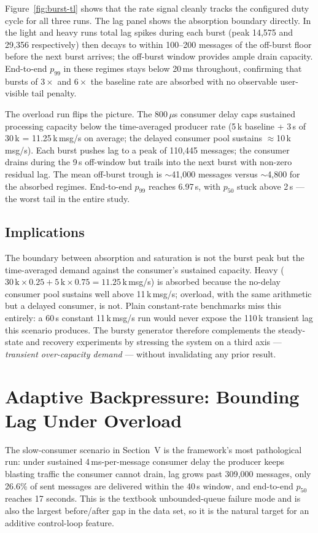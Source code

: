 \documentclass[conference]{IEEEtran}
\begin{document}
Figure~\ref{fig:burst-tl} shows that the rate signal cleanly tracks
the configured duty cycle for all three runs. The lag panel shows
the absorption boundary directly. In the light and heavy runs total
lag spikes during each burst (peak 14{,}575 and 29{,}356 respectively)
then decays to within 100--200 messages of the off-burst floor before
the next burst arrives; the off-burst window provides ample drain
capacity. End-to-end $p_{99}$ in these regimes stays below 20\,ms
throughout, confirming that bursts of $3\times$ and $6\times$
the baseline rate are absorbed with no observable user-visible tail
penalty.

The overload run flips the picture. The 800\,$\mu$s consumer delay
caps sustained processing capacity below the time-averaged producer
rate (5\,k baseline + 3\,s of 30\,k = 11.25\,k\,msg/s on average; the
delayed consumer pool sustains $\approx$10\,k\,msg/s). Each
burst pushes lag to a peak of 110{,}445 messages; the consumer
drains during the 9\,s off-window but trails into the next burst
with non-zero residual lag. The mean off-burst trough is
$\sim$41{,}000 messages versus $\sim$4{,}800 for the absorbed
regimes. End-to-end $p_{99}$ reaches 6.97\,s, with $p_{50}$
stuck above 2\,s --- the worst tail in the entire study.

\subsection{Implications}
The boundary between absorption and saturation is not the burst
peak but the time-averaged demand against the consumer's sustained
capacity. Heavy ($30\,\text{k}\times 0.25 + 5\,\text{k}\times 0.75 =
11.25\,\text{k}$\,msg/s) is absorbed because the no-delay consumer
pool sustains well above 11\,k\,msg/s; overload, with the same
arithmetic but a delayed consumer, is not. Plain constant-rate
benchmarks miss this entirely: a 60\,s constant 11\,k\,msg/s run
would never expose the 110\,k transient lag this scenario produces.
The bursty generator therefore complements the steady-state and
recovery experiments by stressing the system on a third axis ---
\emph{transient over-capacity demand} --- without invalidating any
prior result.

\section{Adaptive Backpressure: Bounding Lag Under Overload}
\label{sec:bp}

The slow-consumer scenario in Section~V is the framework's most
pathological run: under sustained 4\,ms-per-message consumer delay
the producer keeps blasting traffic the consumer cannot drain, lag
grows past 309{,}000 messages, only 26.6\% of sent messages are
delivered within the 40\,s window, and end-to-end $p_{50}$ reaches
17 seconds. This is the textbook unbounded-queue failure mode and is
also the largest before/after gap in the data set, so it is the
natural target for an additive control-loop feature.
\end{document}
